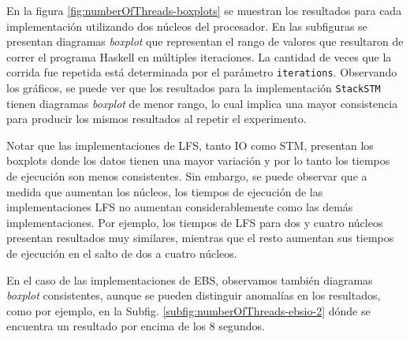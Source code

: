 En la figura \ref{fig:numberOfThreads-boxplots} se muestran los resultados para cada implementación utilizando dos núcleos del procesador.
En las subfiguras se presentan diagramas \emph{boxplot} que representan el rango de valores que resultaron de correr el programa Haskell en múltiples iteraciones.
La cantidad de veces que la corrida fue repetida está determinada por el parámetro \texttt{iterations}. Observando los gráficos, se puede ver que los resultados para la implementación \texttt{StackSTM} tienen diagramas \emph{boxplot} de menor rango, lo cual implica una mayor consistencia para producir los mismos resultados al repetir el experimento.

Notar que las implementaciones de LFS, tanto IO como STM, presentan los boxplots donde los datos tienen una mayor variación y por lo tanto los tiempos de ejecución son menos consistentes. Sin embargo, se puede observar que a medida que aumentan los núcleos, los tiempos de ejecución de las implementaciones LFS no aumentan considerablemente como las demás implementaciones. Por ejemplo, los tiempos de LFS para dos y cuatro núcleos presentan resultados muy similares, mientras que el resto aumentan sus tiempos de ejecución en el salto de dos a cuatro núcleos.

En el caso de las implementaciones de EBS, observamos también diagramas \emph{boxplot} consistentes, aunque se pueden distinguir anomalías en los resultados, como por ejemplo, en la Subfig. \ref{subfig:numberOfThreads-ebsio-2} dónde se encuentra un resultado por encima de los 8 segundos.

